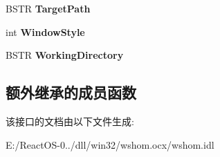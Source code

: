\begin{DoxyCompactItemize}
B\+S\+TR {\bfseries Target\+Path}
\item 
\mbox{\label{interface_i_wsh_runtime_library_1_1_i_wsh_shortcut_a60406bfcf3d6fe238f4889e63964f150}} 
int {\bfseries Window\+Style}
\item 
\mbox{\label{interface_i_wsh_runtime_library_1_1_i_wsh_shortcut_a3fed2957dbbb6492b7a6561276d87b64}} 
B\+S\+TR {\bfseries Working\+Directory}
\end{DoxyCompactItemize}
\subsection*{额外继承的成员函数}


该接口的文档由以下文件生成\+:\begin{DoxyCompactItemize}
\item 
E\+:/\+React\+O\+S-\/0../dll/win32/wshom.\+ocx/wshom.\+idl\end{DoxyCompactItemize}

